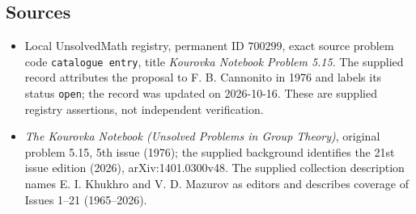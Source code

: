 \documentclass[11pt]{article}
\begin{document}
\subsection{Sources}
\begin{itemize}
\item Local UnsolvedMath registry, permanent ID \(700299\), exact source problem code \texttt{catalogue entry}, title \emph{Kourovka Notebook Problem 5.15}. The supplied record attributes the proposal to F. B. Cannonito in 1976 and labels its status \texttt{open}; the record was updated on 2026-10-16. These are supplied registry assertions, not independent verification.
\item \emph{The Kourovka Notebook (Unsolved Problems in Group Theory)}, original problem 5.15, 5th issue (1976); the supplied background identifies the 21st issue edition (2026), arXiv:1401.0300v48. The supplied collection description names E. I. Khukhro and V. D. Mazurov as editors and describes coverage of Issues 1--21 (1965--2026).
\end{itemize}
\end{document}

